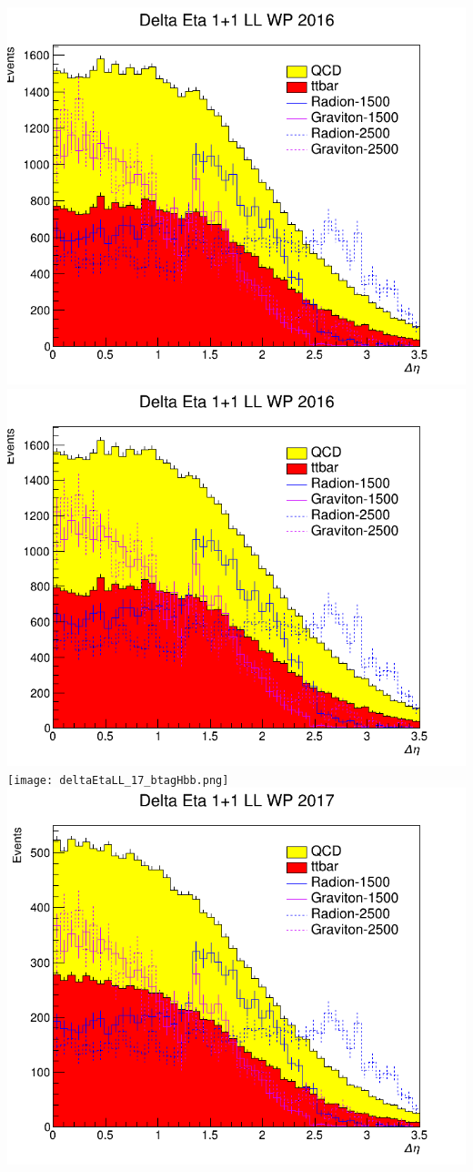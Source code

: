 \includegraphics[width=1\textwidth]{deltaEtaLL_16_btagHbb.png}
\includegraphics[width=1\textwidth]{deltaEtaLL_16_deepTagMD_HbbvsQCD.png}
\texttt{[image: deltaEtaLL\_17\_btagHbb.png]}
\includegraphics[width=1\textwidth]{deltaEtaLL_17_deepTagMD_HbbvsQCD.png}
